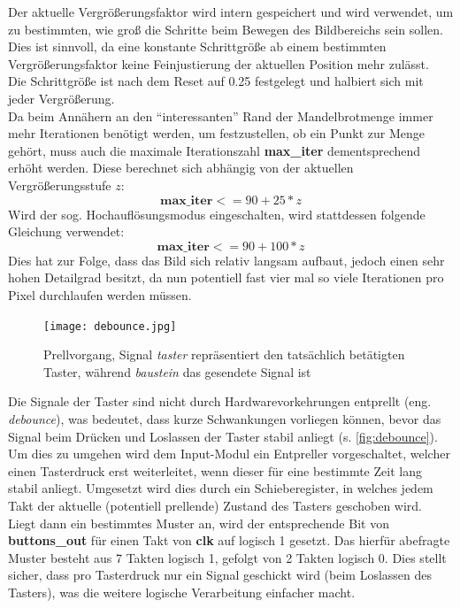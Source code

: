 \documentclass[a4paper,12pt,onesided]{report}
\begin{document}
Der aktuelle Vergrößerungsfaktor wird intern gespeichert und wird verwendet, um zu bestimmten, wie groß die Schritte beim Bewegen des Bildbereichs sein sollen.
Dies ist sinnvoll, da eine konstante Schrittgröße ab einem bestimmten Vergrößerungsfaktor keine Feinjustierung der aktuellen Position mehr zulässt.\\
Die Schrittgröße ist nach dem Reset auf 0.25 festgelegt und halbiert sich mit jeder Vergrößerung.\\
Da beim Annähern an den "`interessanten"' Rand der Mandelbrotmenge immer mehr Iterationen benötigt werden, um festzustellen, ob ein Punkt zur Menge gehört, muss auch die maximale Iterationszahl \textbf{max\_iter} dementsprechend erhöht werden.
Diese berechnet sich abhängig von der aktuellen Vergrößerungsstufe $z$:
\[\mathbf{max\_iter} <= 90+25*z\]
Wird der sog. Hochauflösungsmodus eingeschalten, wird stattdessen folgende Gleichung verwendet:
\[\mathbf{max\_iter} <= 90+100*z\]
Dies hat zur Folge, dass das Bild sich relativ langsam aufbaut, jedoch einen sehr hohen Detailgrad besitzt, da nun potentiell fast vier mal so viele Iterationen pro Pixel durchlaufen werden müssen.\\
\begin{figure}[H]
	\centering
	\texttt{[image: debounce.jpg]}
	\caption{Prellvorgang, Signal \textit{taster} repräsentiert den tatsächlich betätigten Taster, während \textit{baustein} das gesendete Signal ist}
	\label{fig:debounce}
\end{figure}
Die Signale der Taster sind nicht durch Hardwarevorkehrungen entprellt (eng. \textit{debounce}), was bedeutet, dass kurze Schwankungen vorliegen können, bevor das Signal beim Drücken und Loslassen der Taster stabil anliegt (s. \autoref{fig:debounce}).\\
Um dies zu umgehen wird dem Input-Modul ein Entpreller vorgeschaltet, welcher einen Tasterdruck erst weiterleitet, wenn dieser für eine bestimmte Zeit lang stabil anliegt.
Umgesetzt wird dies durch ein Schieberegister, in welches jedem Takt der aktuelle (potentiell prellende) Zustand des Tasters geschoben wird.\\
Liegt dann ein bestimmtes Muster an, wird der entsprechende Bit von \textbf{buttons\_out} für einen Takt von \textbf{clk} auf logisch 1 gesetzt.
Das hierfür abefragte Muster besteht aus 7 Takten logisch 1, gefolgt von 2 Takten logisch 0.
Dies stellt sicher, dass pro Tasterdruck nur ein Signal geschickt wird (beim Loslassen des Tasters), was die weitere logische Verarbeitung einfacher macht.
\end{document}
